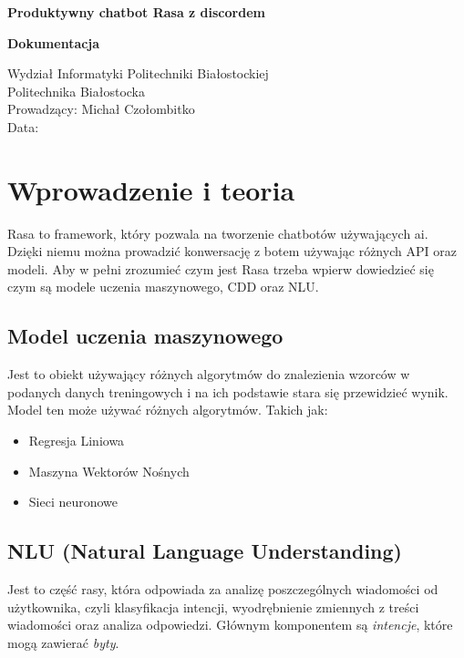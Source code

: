 \documentclass{article}
\begin{document}
\begin{titlepage}
   \begin{center}
       \textbf{Produktywny chatbot Rasa z discordem}

       \textbf{Dokumentacja}


            
        \vspace{15cm}          
     
            
       Wydział Informatyki Politechniki Białostockiej\\
       Politechnika Białostocka\\
       Prowadzący: Michał Czołombitko\\
       Data:
            
   \end{center}
\end{titlepage}

\tableofcontents

\section{Wprowadzenie i teoria}
Rasa to framework, który pozwala na tworzenie chatbotów używających ai. Dzięki
niemu można prowadzić konwersację z botem używając różnych API oraz modeli. Aby
w pełni zrozumieć czym jest Rasa trzeba wpierw dowiedzieć się czym są modele
uczenia maszynowego, CDD oraz NLU.

\subsection{Model uczenia maszynowego}
Jest to obiekt używający różnych algorytmów do znalezienia wzorców w podanych
danych treningowych i na ich podstawie stara się przewidzieć wynik. Model ten
może używać różnych algorytmów. Takich jak:
\begin{itemize}
    \item Regresja Liniowa
    \item Maszyna Wektorów Nośnych
    \item Sieci neuronowe
\end{itemize}

\subsection{NLU (Natural Language Understanding)}
Jest to część rasy, która odpowiada za analizę poszczególnych wiadomości od 
użytkownika, czyli klasyfikacja intencji, wyodrębnienie zmiennych z treści
wiadomości oraz analiza odpowiedzi. Głównym komponentem są \emph{intencje},
które mogą zawierać \emph{byty}.
\end{document}

